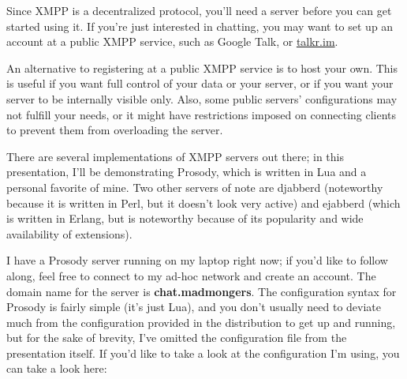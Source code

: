 Since XMPP is a decentralized protocol, you'll need a server before you can get started using it.
If you're just interested in chatting, you may want to set up an account at a public XMPP service,
such as Google Talk, or \url{talkr.im}.

\pause
An alternative to registering at a public XMPP service is to host your own.  This is useful if you want
full control of your data or your server, or if you want your server to be internally visible only.  Also,
some public servers' configurations may not fulfill your needs, or it might have restrictions imposed on
connecting clients to prevent them from overloading the server.

\pause
There are several implementations of XMPP servers out there; in this presentation, I'll be demonstrating Prosody,
which is written in Lua and a personal favorite of mine.  Two other servers of note are djabberd (noteworthy
because it is written in Perl, but it doesn't look very active) and ejabberd (which is written in Erlang, but is
noteworthy because of its popularity and wide availability of extensions).

\pause
I have a Prosody server running on my laptop right now; if you'd like to follow along, feel free to connect to my ad-hoc
network and create an account.  The domain name for the server is \textbf{chat.madmongers}.  The configuration syntax for Prosody is
fairly simple (it's just Lua), and you don't usually need to deviate much from the configuration provided in the distribution to
get up and running, but for the sake of brevity, I've omitted the configuration file from the presentation itself.  If you'd
like to take a look at the configuration I'm using, you can take a look here:

\pause
{}
